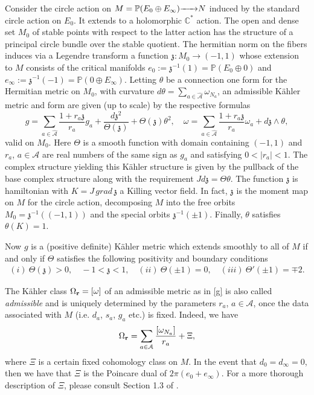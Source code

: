 \documentclass[12pt]{amsart}
\def\bbc{{\mathbb C}}
\def\bbp{{\mathbb P}}
\def\bfr{{\bf r}}
\def\cala{{\mathcal A}}
\def\ra#1{\hbox to #1pc{\rightarrowfill}}
\def\gz{{\mathfrak z}}
\begin{document}
Consider the circle action
on $M=\bbp(E_0\oplus E_\infty)\ra{1.8} N$ induced by the standard circle action on $E_0$. It extends to a holomorphic
$\bbc^*$ action. The open and dense set $M_0$ of stable points with respect to the
latter action has the structure of a principal circle bundle over the stable quotient.
The hermitian norm on the fibers induces via a Legendre transform a function
$\gz:M_0\rightarrow (-1,1)$ whose extension to $M$ consists of the critical manifolds
$e_0:= \gz^{-1}(1)=\bbp(E_{0} \oplus 0)$ and $e_\infty:= \gz^{-1}(-1)=\bbp(0 \oplus E_{\infty})$.
Letting $\theta$ be a connection one form for the Hermitian metric on $M_0$, with curvature
$d\theta = \sum_{a\in\hat{\cala}}\omega_{N_a}$, an admissible K\"ahler metric and form are
given (up to scale) by the respective formulas
\begin{equation}\label{g}
g=\sum_{a\in\hat{\cala}}\frac{1+r_a\gz}{r_a}g_a+\frac {d\gz^2}
{\Theta (\gz)}+\Theta (\gz)\theta^2,\quad
\omega = \sum_{a\in\hat{\cala}}\frac{1+r_a\gz}{r_a}\omega_{a} + d\gz \wedge
\theta,
\end{equation}
valid on $M_0$. Here $\Theta$ is a smooth function with domain containing
$(-1,1)$ and $r_a$, $a \in \cala$ are real numbers of the same sign as
$g_{a}$ and satisfying $0 < |r_a| < 1$. The complex structure yielding this
K\"ahler structure is given by the pullback of the base complex structure
along with the requirement $Jd\gz = \Theta \theta$. The function $\gz$ is hamiltonian
with $K= J \,grad\, \gz$ a Killing vector field. In fact, $\gz$ is the moment 
map on $M$ for the circle action, decomposing $M$ into 
the free orbits $M_{0} = \gz^{-1}((-1,1))$ and the special orbits 
$\gz^{-1}(\pm 1)$. Finally, $\theta$ satisfies
$\theta(K)=1$.

Now $g$ is a (positive definite) K\"ahler metric which extends smoothly to all of $M$ if and only if
$\Theta$ satisfies the following positivity and boundary
conditions
\begin{align}
\label{positivity}
(i)\ \Theta(\gz) > 0, \quad -1 < \gz <1,\quad
(ii)\ \Theta(\pm 1) = 0,\quad
(iii)\ \Theta'(\pm 1) = \mp 2.
\end{align}

The K\"ahler class $\Omega_{\bfr} = [\omega]$ of an admissible metric as in \eqref{g} is also called
{\it admissible} and is uniquely determined by the parameters
$r_a$, $a \in \cala$, once the data associated with $M$ (i.e.
$d_a$, $s_a$, $g_a$ etc.) is fixed. Indeed, we have
$$ \Omega_{\bfr} =\sum_{a \in \cala} \frac{[\omega_{N_a}]}{r_a} + \Xi,$$
where $\Xi$ is a certain fixed cohomology class on $M$.
In the event that $d_0=d_\infty=0$, then we have that
$\Xi$ is the Poincare dual of $2\pi(e_0+e_\infty)$.
For a more thorough description of $\Xi$, please consult Section 1.3 of \cite{ACGT08}.
\end{document}
